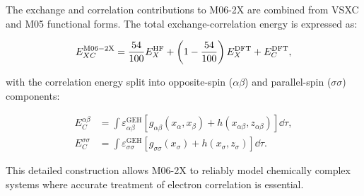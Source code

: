 
The exchange and correlation contributions to M06-2X are combined from VSXC and
M05 functional forms. The total exchange-correlation energy is expressed as:

\begin{align}
  E_{XC}^{\mathrm{M06-2X}} = \frac{54}{100}E_X^{\mathrm{HF}} + \left(1-\frac{54}{100}\right)E_X^{\mathrm{DFT}} + E_C^{\mathrm{DFT}},
\end{align}

\noindent with the correlation energy split into opposite-spin ($\alpha\beta$)
and parallel-spin ($\sigma\sigma$) components:

\begin{align}
  E_C^{\alpha\beta} &= \int \varepsilon^{\mathrm{GEH}}_{\alpha\beta}
    \left[g_{\alpha\beta}(x_\alpha,x_\beta) + h(x_{\alpha\beta},z_{\alpha\beta})\right]\dd\tau, \\
  E_C^{\sigma\sigma} &= \int \varepsilon^{\mathrm{GEH}}_{\sigma\sigma}
    \left[g_{\sigma\sigma}(x_\sigma) + h(x_\sigma,z_\sigma)\right]\dd\tau.
\end{align}

This detailed construction allows M06-2X to reliably model chemically complex
systems where accurate treatment of electron correlation is essential.






